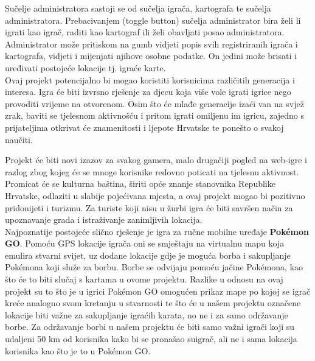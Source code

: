 		\textnormal{Sučelje administratora sastoji se od sučelja igrača, kartografa te sučelja administratora. Prebacivanjem (toggle button) sučelja administrator bira želi li igrati kao igrač, raditi kao kartograf ili želi obavljati posao administratora. Administrator može pritiskom na gumb vidjeti popis svih registriranih igrača i kartografa, vidjeti i mijenjati njihove osobne podatke. On jedini može brisati i uređivati postojeće lokacije tj. igraće karte.}\\
		
		
		\textnormal{Ovaj projekt potencijalno bi mogao koristiti korisnicima različitih generacija i interesa. Igra će biti izvrsno rješenje za djecu koja više vole igrati igrice nego provoditi vrijeme na otvorenom. Osim što će mlađe generacije izaći van na svjež zrak, baviti se tjelesnom aktivnošću i pritom igrati omiljenu im igricu, zajedno s prijateljima otkrivat će znamenitosti i ljepote Hrvatske te ponešto o svakoj naučiti.}
		
		\textnormal{Projekt će biti novi izazov za svakog gamera, malo drugačiji pogled na web-igre i razlog zbog kojeg će se mnoge korisnike redovno poticati na tjelesnu aktivnost. Promicat će se kulturna baština, širiti opće znanje stanovnika Republike Hrvatske, odlaziti u slabije pojećivana mjesta, a ovaj projekt mogao bi pozitivno pridonijeti i turizmu. Za turiste koji nisu u žurbi igra će biti savršen način za upoznavanje grada i istraživanje zanimljivih lokacija.}\\
		
		
		\textnormal{Najpoznatije postojeće slično rješenje je igra za ručne mobilne uređaje \textbf{Pokémon GO}. Pomoću GPS lokacije igrača oni se smještaju na virtualnu mapu koja emulira stvarni svijet, uz dodane lokacije gdje je moguća borba i sakupljanje Pokémona koji služe za borbu. Borbe se odvijaju pomoću jačine Pokémona, kao što će to biti slučaj s kartama u ovome projektu. Razlike u odnosu na ovaj projekt su to što je u igrici Pokémon GO omogućen prikaz mape po kojoj se igrač kreće analogno svom kretanju u stvarnosti te što će u našem projektu označene lokacije biti važne za sakupljanje igraćih karata, no ne i za samo održavanje borbe. Za održavanje borbi u našem projektu će biti samo važni igrači koji su udaljeni 50 km od korisnika kako bi se pronašao suigrač, ali ne i sama lokacija korisnika kao što je to u Pokémon GO.    }
		
